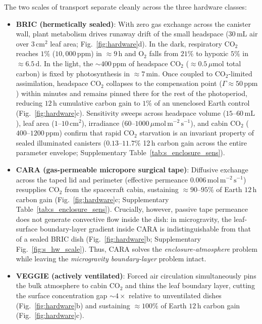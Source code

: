 \documentclass[final,5p,times,twocolumn,numbers,sort&compress]{elsarticle}
\newcommand{\ums}{\ensuremath{\mu\mathrm{mol\,m^{-2}\,s^{-1}}}}
\newcommand{\molms}{\ensuremath{\mathrm{mol\,m^{-2}\,s^{-1}}}}
\begin{document}
The two scales of transport separate cleanly across the three hardware classes:
\begin{itemize}
    \item \textbf{BRIC (hermetically sealed)}: With zero gas exchange across the canister wall, plant metabolism drives runaway drift of the small headspace ($30\,\mathrm{mL}$ air over $3\,\mathrm{cm^2}$ leaf area; Fig.~\ref{fig:hardware}d). In the dark, respiratory $\mathrm{CO_2}$ reaches $1\%$ ($10{,}000\,\mathrm{ppm}$) in $\approx 9\,\mathrm{h}$ and $\mathrm{O_2}$ falls from $21\%$ to hypoxic $5\%$ in $\approx 6.5\,\mathrm{d}$. In the light, the $\sim 400\,\mathrm{ppm}$ of headspace $\mathrm{CO_2}$ ($\approx 0.5\,\mu\mathrm{mol}$ total carbon) is fixed by photosynthesis in \textbf{$\approx 7\,\mathrm{min}$}. Once coupled to $\mathrm{CO_2}$-limited assimilation, headspace $\mathrm{CO_2}$ collapses to the compensation point ($\Gamma\approx 50\,\mathrm{ppm}$) within minutes and remains pinned there for the rest of the photoperiod, reducing $12\,\mathrm{h}$ cumulative carbon gain to \textbf{$1\%$} of an unenclosed Earth control (Fig.~\ref{fig:hardware}c). Sensitivity sweeps across headspace volume ($15\text{--}60\,\mathrm{mL}$), leaf area ($1\text{--}10\,\mathrm{cm^2}$), irradiance ($60\text{--}1000\,\ums$), and cabin $\mathrm{CO_2}$ ($400\text{--}1200\,\mathrm{ppm}$) confirm that rapid $\mathrm{CO_2}$ starvation is an invariant property of sealed illuminated canisters ($0.13\text{--}11.7\%$ 12\,h carbon gain across the entire parameter envelope; Supplementary Table~\ref{tab:s_enclosure_sens}).
    \item \textbf{CARA (gas-permeable micropore surgical tape)}: Diffusive exchange across the taped lid and perimeter (effective permeance $0.006\,\molms$) resupplies $\mathrm{CO_2}$ from the spacecraft cabin, sustaining \textbf{$\approx 90\text{--}95\%$} of Earth $12\,\mathrm{h}$ carbon gain (Fig.~\ref{fig:hardware}c; Supplementary Table~\ref{tab:s_enclosure_sens}). Crucially, however, passive tape permeance does not generate convective flow inside the dish: in microgravity, the leaf-surface boundary-layer gradient inside CARA is indistinguishable from that of a sealed BRIC dish (Fig.~\ref{fig:hardware}b; Supplementary Fig.~\ref{fig:s_hw_scale}). Thus, CARA solves the \emph{enclosure-atmosphere} problem while leaving the \emph{microgravity boundary-layer} problem intact.
    \item \textbf{VEGGIE (actively ventilated)}: Forced air circulation simultaneously pins the bulk atmosphere to cabin $\mathrm{CO_2}$ and thins the leaf boundary layer, cutting the surface concentration gap $\sim 4\times$ relative to unventilated dishes (Fig.~\ref{fig:hardware}b) and sustaining \textbf{$\approx 100\%$} of Earth $12\,\mathrm{h}$ carbon gain (Fig.~\ref{fig:hardware}c).
\end{itemize}
\end{document}
